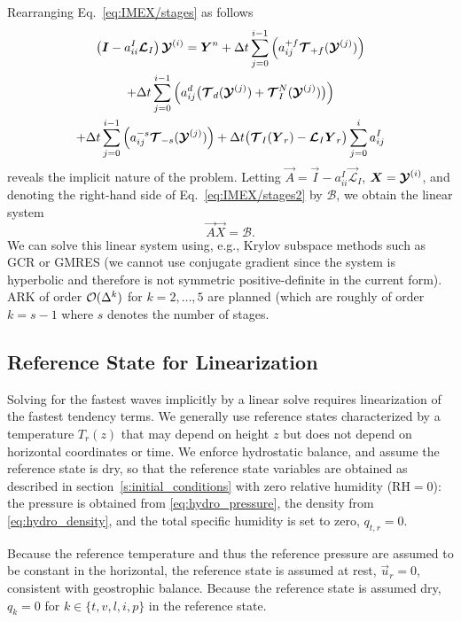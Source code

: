 \documentclass{report}
\begin{document}
{Rearranging Eq.~\eqref{eq:IMEX/stages} as follows 
\begin{multline}\label{eq:IMEX/stages2}
\left( \boldsymbol{{I}} - {a}^{I}_{ii}\boldsymbol{{\mathcal{L}}}_{I} \right)  \boldsymbol{{\mathcal{Y}}}^{(i)}  =  \boldsymbol{{Y}}^n + 
\Delta t \sum_{j=0}^{i-1} \left( {a}^{+f}_{ij} \boldsymbol{{\mathcal{T}}}_{+f}(\boldsymbol{{\mathcal{Y}}}^{(j)}) \right)   \\
+ \Delta t \sum_{j=0}^{i-1} \left( {a}^{d}_{ij} \bigl(\boldsymbol{{\mathcal{T}}}_{d}(\boldsymbol{{\mathcal{Y}}}^{(j)}) + \boldsymbol{{\mathcal{T}}}^N_I(\boldsymbol{{\mathcal{Y}}}^{(j)})\bigr) \right) \\
+ \Delta t \sum_{j=0}^{i-1} \left( {a}^{-s}_{ij} \boldsymbol{{\mathcal{T}}}_{-s}(\boldsymbol{{\mathcal{Y}}}^{(j)}) \right) + \Delta t \bigl(\boldsymbol{{\mathcal{T}}}_I(\boldsymbol{{Y}}_r) - \boldsymbol{{\mathcal{L}}}_I \boldsymbol{{Y}}_r \bigr) \sum_{j=0}^i a_{ij}^I
\end{multline}
reveals the implicit nature of the problem. Letting $\vec{A}=\vec{I} - {a}^{I}_{ii} \vec{\mathcal{L}}_{I}$, $\boldsymbol{{X}}=\boldsymbol{{\mathcal{Y}}}^{(i)}$, and denoting the right-hand side of Eq.~\eqref{eq:IMEX/stages2} by $\mathcal{B}$, we obtain the linear system 
\[
\vec{A} \vec{X} = \mathcal{B}.
\]
We can solve this linear system using, e.g., Krylov subspace methods such as GCR or GMRES (we cannot use conjugate gradient since the system is hyperbolic and therefore is not symmetric positive-definite in the current form). ARK of order $\mathcal{O}(\Delta ^k)$ for $k=2,\ldots,5$ are planned (which are roughly of order $k=s-1$ where $s$ denotes the number of stages.
}

\subsection{Reference State for Linearization}

Solving for the fastest waves implicitly by a linear solve requires linearization of the fastest tendency terms. We generally use reference states characterized by a temperature $T_r(z)$ that may depend on height $z$ but does not depend on horizontal coordinates or time. We enforce hydrostatic balance, and assume the reference state is dry, so that the reference state variables are obtained as described in section~\ref{s:initial_conditions} with zero relative humidity ($\mathrm{RH}=0$): the pressure is obtained from \eqref{eq:hydro_pressure}, the density from \eqref{eq:hydro_density}, and the total specific humidity is set to zero, $q_{t,r}=0$.

Because the reference temperature and thus the reference pressure are assumed to be constant in the horizontal, the reference state is assumed at rest, $\vec{u}_r = 0$, consistent with geostrophic balance. Because the reference state is assumed dry, $q_k= 0$ for $k \in \{ t, v, l, i, p\}$ in the reference state.
\end{document}

